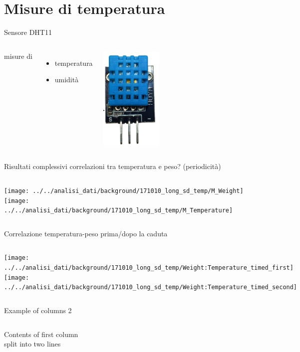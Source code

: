 \documentclass{beamer}
\begin{document}
\section{Misure di temperatura}
\begin{frame}{Sensore DHT11}
  \begin{columns}[c] 
      misure di 
      \begin{itemize}
        \item temperatura
        \item umidit\`a
      \end{itemize}
      \includegraphics[height=5cm]{../Foto/DHT11}
   \end{columns}
\end{frame}
\begin{frame}{Risultati complessivi}
  correlazioni tra temperatura e peso? (periodicit\`a)
  \begin{columns}[c] 
      \texttt{[image: ../../analisi\_dati/background/171010\_long\_sd\_temp/M\_Weight]}
      \texttt{[image: ../../analisi\_dati/background/171010\_long\_sd\_temp/M\_Temperature]}   
   \end{columns}
\end{frame}
\begin{frame}{Correlazione temperatura-peso}
  prima/dopo la caduta
  \begin{columns}[c] 
      \texttt{[image: ../../analisi\_dati/background/171010\_long\_sd\_temp/Weight:Temperature\_timed\_first]}
      \texttt{[image: ../../analisi\_dati/background/171010\_long\_sd\_temp/Weight:Temperature\_timed\_second]}
   \end{columns}
\end{frame}





\begin{frame}{Example of columns 2}
\begin{columns}[T] %
\begin{column}[T]{5cm} %
Contents of first column \\ split into two lines
\end{column}
\begin{column}[T]{5cm} %
\end{column}
\end{columns}
\end{frame}
\end{document}
